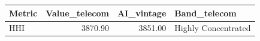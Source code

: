 \begin{tabular}{lrrl}
\toprule
Metric & Value_telecom & AI_vintage & Band_telecom \\
\midrule
HHI & 3870.90 & 3851.00 & Highly Concentrated \\
\bottomrule
\end{tabular}
